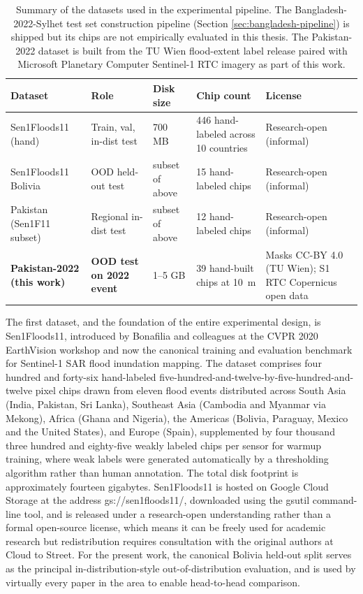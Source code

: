 \documentclass[11pt,a4paper,oneside]{report}
\begin{document}
\begin{table}[H]
\centering
\caption{Summary of the datasets used in the experimental pipeline. The Bangladesh-2022-Sylhet test set construction pipeline (Section \ref{sec:bangladesh-pipeline}) is shipped but its chips are not empirically evaluated in this thesis. The Pakistan-2022 dataset is built from the TU Wien flood-extent label release paired with Microsoft Planetary Computer Sentinel-1 RTC imagery as part of this work.}
\label{tab:datasets}
\small
\begin{tabular}{p{2.9cm}p{2.7cm}p{1.5cm}p{1.4cm}p{3.5cm}}
\toprule
\textbf{Dataset} & \textbf{Role} & \textbf{Disk size} & \textbf{Chip count} & \textbf{License} \\
\midrule
Sen1Floods11 (hand) & Train, val, in-dist test & 700 MB & 446 hand-labeled across 10 countries & Research-open (informal) \\
Sen1Floods11 Bolivia & OOD held-out test & subset of above & 15 hand-labeled chips & Research-open (informal) \\
Pakistan (Sen1F11 subset) & Regional in-dist test & subset of above & 12 hand-labeled chips & Research-open (informal) \\
\textbf{Pakistan-2022 (this work)} & \textbf{OOD test on 2022 event} & 1--5 GB & 39 hand-built chips at 10~m & Masks CC-BY 4.0 (TU Wien); S1 RTC Copernicus open data \\
\bottomrule
\end{tabular}
\end{table}

The first dataset, and the foundation of the entire experimental design, is Sen1Floods11, introduced by Bonafilia and colleagues at the CVPR 2020 EarthVision workshop \cite{Bonafilia2020Sen1Floods11} and now the canonical training and evaluation benchmark for Sentinel-1 SAR flood inundation mapping. The dataset comprises four hundred and forty-six hand-labeled five-hundred-and-twelve-by-five-hundred-and-twelve pixel chips drawn from eleven flood events distributed across South Asia (India, Pakistan, Sri Lanka), Southeast Asia (Cambodia and Myanmar via Mekong), Africa (Ghana and Nigeria), the Americas (Bolivia, Paraguay, Mexico and the United States), and Europe (Spain), supplemented by four thousand three hundred and eighty-five weakly labeled chips per sensor for warmup training, where weak labels were generated automatically by a thresholding algorithm rather than human annotation. The total disk footprint is approximately fourteen gigabytes. Sen1Floods11 is hosted on Google Cloud Storage at the address gs://sen1floods11/, downloaded using the gsutil command-line tool, and is released under a research-open understanding rather than a formal open-source license, which means it can be freely used for academic research but redistribution requires consultation with the original authors at Cloud to Street. For the present work, the canonical Bolivia held-out split serves as the principal in-distribution-style out-of-distribution evaluation, and is used by virtually every paper in the area to enable head-to-head comparison.
\end{document}
